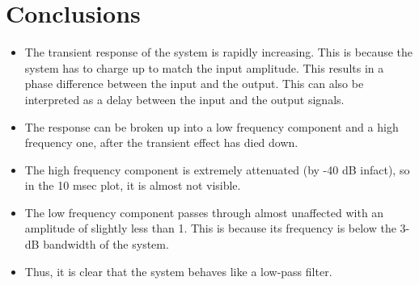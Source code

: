 \documentclass[11pt]{article}
\providecommand{\tightlist}{%
      \setlength{\itemsep}{0pt}\setlength{\parskip}{0pt}}
\begin{document}
	
		
    \section{Conclusions}\label{conclusions}

\begin{itemize}
\tightlist
\item
  The transient response of the system is rapidly increasing. This is
  because the system has to charge up to match the input amplitude. This
  results in a phase difference between the input and the output. This
  can also be interpreted as a delay between the input and the output
  signals.
\item
  The response can be broken up into a low frequency component and a
  high frequency one, after the transient effect has died down.
\item
  The high frequency component is extremely attenuated (by -40 dB
  infact), so in the 10 msec plot, it is almost not visible.
\item
  The low frequency component passes through almost unaffected with an
  amplitude of slightly less than 1. This is because its frequency is
  below the 3-dB bandwidth of the system.
\item
  Thus, it is clear that the system behaves like a low-pass filter.
\end{itemize}

	


    
    
    
    
\end{document}
